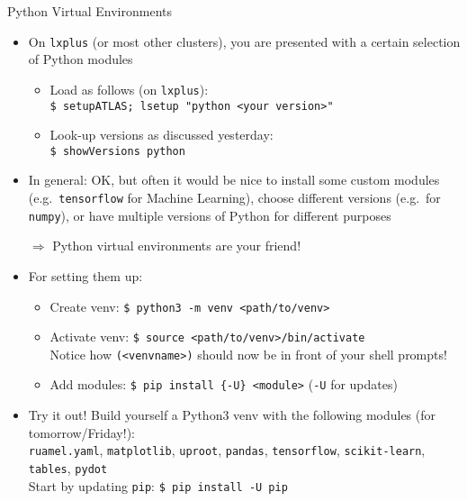\documentclass[10pt, aspectratio=169]{beamer}
\begin{document}
\begin{frame}{Python Virtual Environments}
\begin{itemize}
  \item
    On \texttt{lxplus} (or most other clusters), you are presented with a certain selection of Python modules
    \begin{itemize}
      \item
        Load as follows (on \texttt{lxplus}): \\
        \quad \texttt{\$ setupATLAS; lsetup "python <your version>"}
      \item
        Look-up versions as discussed yesterday: \\
        \quad \texttt{\$ showVersions python}
    \end{itemize}
  \item
    In general: OK, but often it would be nice to install some custom modules (e.g.\ \texttt{tensorflow} for Machine Learning), choose different versions (e.g.\ for \texttt{numpy}), or have multiple versions of Python for different purposes
  \item[$\Rightarrow$]
    Python virtual environments are your friend!
  \item
    For setting them up:
    \begin{itemize}
      \item
        Create venv: \texttt{\$ python{3} -m venv <path/to/venv>}
      \item
        Activate venv: \texttt{\$ source <path/to/venv>/bin/activate} \\
        Notice how \texttt{(<venvname>)} should now be in front of your shell prompts!
      \item
        Add modules: \texttt{\$ pip install \{-U\} <module>} (\texttt{-U} for updates)
    \end{itemize}
  \item
    Try it out! Build yourself a Python3 venv with the following modules (for tomorrow/Friday!): \\
    \texttt{ruamel.yaml}, \texttt{matplotlib}, \texttt{uproot}, \texttt{pandas}, \texttt{tensorflow}, \texttt{scikit-learn}, \texttt{tables}, \texttt{pydot} \\
     Start by updating \texttt{pip}: \texttt{\$ pip install -U pip}
\end{itemize}
\end{frame}
\end{document}
